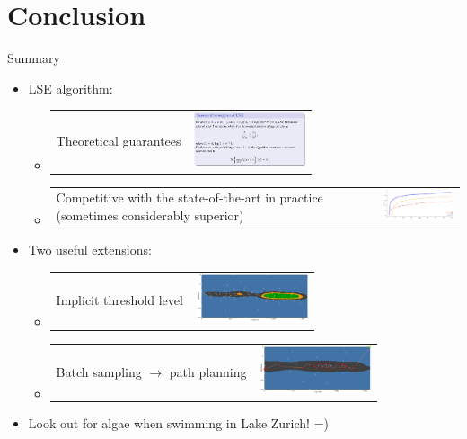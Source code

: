 \documentclass[10pt,mathserif,serif,handout]{beamer}
\newcommand{\acl}{\textsf{LSE}\xspace}
\begin{document}
\section*{Conclusion}

\begin{frame}
\begin{center}
\large Summary
\end{center}
\vspace{-1em}
\begin{itemize}
\item<1-> \acl algorithm:
\begin{itemize}
\item<2-> \begin{tabular}{m{5.5cm} >{\centering}m{4cm}}Theoretical guarantees & \includegraphics[width=1.3in]{figures/thm.png} \end{tabular}
\item<3-> \begin{tabular}{m{5.5cm} >{\centering}m{4cm}}Competitive with the state-of-the-art in practice (sometimes considerably superior) & \hspace{-0.5em}\includegraphics[width=1.3in]{figures/ev_bgape_seq_long} \end{tabular}
\end{itemize}
\item<4-> Two useful extensions:
\begin{itemize}
\item<5-> \begin{tabular}{m{5.5cm} >{\centering}m{4cm}}Implicit threshold level & \includegraphics[width=1.3in]{figures/limno_bgape_imp_class_140} \end{tabular}
\item<6-> \begin{tabular}{m{5.5cm} >{\centering}m{4cm}}Batch sampling $\rightarrow$ path planning & \includegraphics[width=1.3in]{figures/limno_bgape_pp_30_2} \end{tabular}
\end{itemize}
\item<7-> Look out for algae when swimming in Lake Zurich! =)
\end{itemize}
\end{frame}
\end{document}
